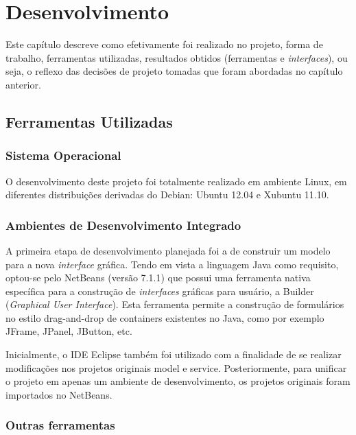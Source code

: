 
\chapter{Desenvolvimento} %

Este capítulo descreve como efetivamente foi realizado no projeto, forma de trabalho, ferramentas utilizadas, resultados obtidos (ferramentas e \emph{interfaces}), ou seja, o reflexo das decisões de projeto tomadas que foram abordadas no capítulo anterior.

\section{Ferramentas Utilizadas}
\subsection{Sistema Operacional}

O desenvolvimento deste projeto foi totalmente realizado em ambiente Linux, em diferentes distribuições derivadas do Debian: Ubuntu 12.04 e Xubuntu 11.10.

\subsection{Ambientes de Desenvolvimento Integrado}

A primeira etapa de desenvolvimento planejada foi a de construir um modelo para a nova \emph{interface} gráfica. Tendo em vista a linguagem Java como requisito, optou-se pelo  NetBeans (versão 7.1.1) que possui uma ferramenta nativa específica para a construção de \emph{interfaces} gráficas para usuário, a  Builder (\emph{Graphical User Interface}). Esta ferramenta permite a construção de formulários no estilo drag-and-drop de containers existentes no Java, como por exemplo JFrame, JPanel, JButton, etc.

Inicialmente, o IDE Eclipse também foi utilizado com a finalidade de se realizar modificações nos projetos originais model e service. Posteriormente, para unificar o projeto em apenas um ambiente de desenvolvimento, os projetos originais foram importados no NetBeans.

\subsection{Outras ferramentas}

